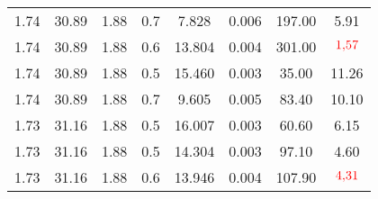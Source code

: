 \begin{table}[H]
\begin{tabular}{S S S S S S S S }
1.74  & 30.89  & 1.88  & 0.7  & 7.828  & 0.006  & 197.00  & 5.91\\
1.74  & 30.89  & 1.88  & 0.6  & 13.804  & 0.004  & 301.00  & $\textcolor{red}{\num{1.57}}$\\
1.74  & 30.89  & 1.88  & 0.5  & 15.460  & 0.003  & 35.00  & 11.26\\
1.74  & 30.89  & 1.88  & 0.7  & 9.605  & 0.005  & 83.40  & 10.10\\
1.73  & 31.16  & 1.88  & 0.5  & 16.007  & 0.003  & 60.60  & 6.15\\
1.73  & 31.16  & 1.88  & 0.5  & 14.304  & 0.003  & 97.10  & 4.60\\
1.73  & 31.16  & 1.88  & 0.6  & 13.946  & 0.004  & 107.90  & $\textcolor{red}{\num{4.31}}$\\
\bottomrule
\end{tabular}
\end{table}

